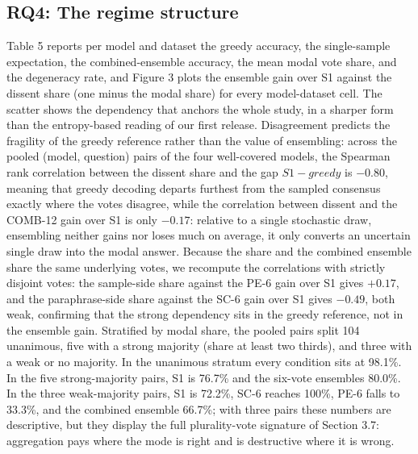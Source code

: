 \documentclass[preprint,12pt]{elsarticle}
\begin{document}
\subsection{RQ4: The regime structure}


Table 5 reports per model and dataset the greedy accuracy, the single-sample expectation, the combined-ensemble accuracy, the mean modal vote share, and the degeneracy rate, and Figure 3 plots the ensemble gain over S1 against the dissent share (one minus the modal share) for every model-dataset cell. The scatter shows the dependency that anchors the whole study, in a sharper form than the entropy-based reading of our first release. Disagreement predicts the fragility of the greedy reference rather than the value of ensembling: across the pooled (model, question) pairs of the four well-covered models, the Spearman rank correlation between the dissent share and the gap $S1 - greedy$ is $-0.80$, meaning that greedy decoding departs furthest from the sampled consensus exactly where the votes disagree, while the correlation between dissent and the COMB-12 gain over S1 is only $-0.17$: relative to a single stochastic draw, ensembling neither gains nor loses much on average, it only converts an uncertain single draw into the modal answer. Because the share and the combined ensemble share the same underlying votes, we recompute the correlations with strictly disjoint votes: the sample-side share against the PE-6 gain over S1 gives $+0.17$, and the paraphrase-side share against the SC-6 gain over S1 gives $-0.49$, both weak, confirming that the strong dependency sits in the greedy reference, not in the ensemble gain. Stratified by modal share, the pooled pairs split 104 unanimous, five with a strong majority (share at least two thirds), and three with a weak or no majority. In the unanimous stratum every condition sits at 98.1\%. In the five strong-majority pairs, S1 is 76.7\% and the six-vote ensembles 80.0\%. In the three weak-majority pairs, S1 is 72.2\%, SC-6 reaches 100\%, PE-6 falls to 33.3\%, and the combined ensemble 66.7\%; with three pairs these numbers are descriptive, but they display the full plurality-vote signature of Section 3.7: aggregation pays where the mode is right and is destructive where it is wrong.
\end{document}
